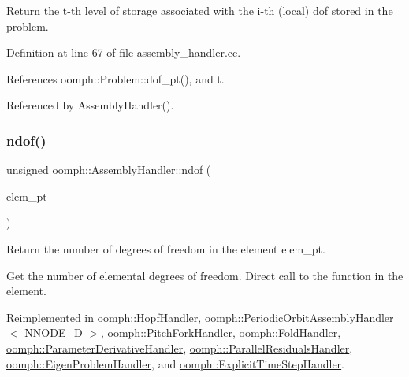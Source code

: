 Return the t-\/th level of storage associated with the i-\/th (local) dof stored in the problem. 



Definition at line 67 of file assembly\+\_\+handler.\+cc.



References oomph\+::\+Problem\+::dof\+\_\+pt(), and t.



Referenced by Assembly\+Handler().

\mbox{\label{classoomph_1_1AssemblyHandler_a09213be8f4aa009e0366460a7ed78e68}} 
\subsubsection{\texorpdfstring{ndof()}{ndof()}}
{\footnotesize\ttfamily unsigned oomph\+::\+Assembly\+Handler\+::ndof (\begin{DoxyParamCaption}\item[{\hyperlink{classoomph_1_1GeneralisedElement}{Generalised\+Element} $\ast$const \&}]{elem\+\_\+pt }\end{DoxyParamCaption})\hspace{0.3cm}{\ttfamily [virtual]}}



Return the number of degrees of freedom in the element elem\+\_\+pt. 

Get the number of elemental degrees of freedom. Direct call to the function in the element. 

Reimplemented in \hyperlink{classoomph_1_1HopfHandler_a8d1b73ec4e9b8b27252b4bacf2ef7f38}{oomph\+::\+Hopf\+Handler}, \hyperlink{classoomph_1_1PeriodicOrbitAssemblyHandler_ab960ecaac9239cfbc47f1036893362ff}{oomph\+::\+Periodic\+Orbit\+Assembly\+Handler$<$ N\+N\+O\+D\+E\+\_\+D $>$}, \hyperlink{classoomph_1_1PitchForkHandler_ae066fa45e9f1bf10601286ca2d083a42}{oomph\+::\+Pitch\+Fork\+Handler}, \hyperlink{classoomph_1_1FoldHandler_af8e766d1faa7867a0161329566865867}{oomph\+::\+Fold\+Handler}, \hyperlink{classoomph_1_1ParameterDerivativeHandler_a341d4e7cfaab7e66df43913d775a6871}{oomph\+::\+Parameter\+Derivative\+Handler}, \hyperlink{classoomph_1_1ParallelResidualsHandler_a16eb9ec097e85c5da57b2e588d9683b6}{oomph\+::\+Parallel\+Residuals\+Handler}, \hyperlink{classoomph_1_1EigenProblemHandler_ae9e44eeceee6e19c60c51b08195730eb}{oomph\+::\+Eigen\+Problem\+Handler}, and \hyperlink{classoomph_1_1ExplicitTimeStepHandler_a723bec764e9e59025f052f6ca0135181}{oomph\+::\+Explicit\+Time\+Step\+Handler}.



